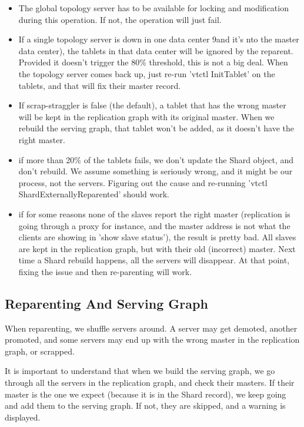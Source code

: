 \begin{itemize}
\item The global topology server has to be available for locking and modification during this operation. If not, the operation will just fail.
\item If a single topology server is down in one data center 9and it's nto the master data center), the tablets in that data center will be ignored by the reparent. Provided it doesn't trigger the 80\% threshold, this is not a big deal. When the topology server comes back up, just re-run 'vtctl InitTablet' on the tablets, and that will fix their master record.
\item If scrap-straggler is false (the default), a tablet that has the wrong master will be kept in the replication graph with its original master. When we rebuild the serving graph, that tablet won't be added, as it doesn't have the right master.
\item if more than 20\% of the tablets fails, we don't update the Shard object, and don't rebuild. We assume something is seriously wrong, and it might be our process, not the servers. Figuring out the cause and re-running 'vtctl ShardExternallyReparented' should work.
\item if for some reasons none of the slaves report the right master (replication is going through a proxy for instance, and the master address is not what the clients are showing in 'show slave status'), the result is pretty bad. All slaves are kept in the replication graph, but with their old (incorrect) master. Next time a Shard rebuild happens, all the servers will disappear. At that point, fixing the issue and then re-parenting will work.
\end{itemize}

\subsection{Reparenting And Serving Graph}\label{reparenting-and-serving-graph}

When reparenting, we shuffle servers around. A server may get demoted, another promoted, and some servers may end up with the wrong master in the replication graph, or scrapped.

It is important to understand that when we build the serving graph, we go through all the servers in the replication graph, and check their masters. If their master is the one we expect (because it is in the Shard record), we keep going and add them to the serving graph. If not, they are skipped, and a warning is displayed.

